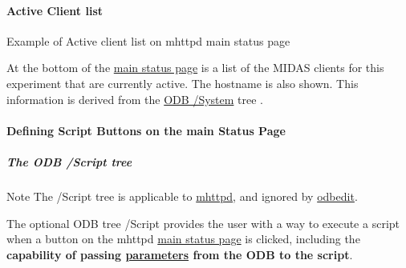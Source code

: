 \par


\par


\label{RC_mhttpd_status_page_features_idx_clients_active_mhttpd}
\hypertarget{RC_mhttpd_status_page_features_idx_clients_active_mhttpd}{}
 \hypertarget{RC_mhttpd_status_page_features_RC_mhttpd_status_clients}{}\paragraph{Active Client list}\label{RC_mhttpd_status_page_features_RC_mhttpd_status_clients}
\begin{center} Example of Active client list on mhttpd main status page \par
\par
\par
  \end{center}  \par


At the bottom of the \hyperlink{RC_mhttpd_Main_Status_page_RC_mhttpd_main_status}{main status page} is a list of the MIDAS clients for this experiment that are currently active. The hostname is also shown. This information is derived from the \hyperlink{RC_Run_States_and_Transitions_RC_odb_system_tree}{ODB /System} tree .

\par
\par


 \par
 \label{index_end}
\hypertarget{index_end}{}
 \paragraph{Defining Script Buttons on the main Status Page}\label{RC_mhttpd_defining_script_buttons}
\par




\label{RC_mhttpd_defining_script_buttons_idx_ODB_tree_Script}
\hypertarget{RC_mhttpd_defining_script_buttons_idx_ODB_tree_Script}{}
 \hypertarget{RC_mhttpd_defining_script_buttons_RC_odb_script_tree}{}\subparagraph{The ODB /Script tree}\label{RC_mhttpd_defining_script_buttons_RC_odb_script_tree}
\begin{DoxyNote}{Note}
The /Script tree is applicable to \hyperlink{RC_mhttpd}{mhttpd}, and ignored by \hyperlink{RC_odbedit}{odbedit}.
\end{DoxyNote}
The optional ODB tree /Script provides the user with a way to execute a script when a button on the mhttpd \hyperlink{RC_mhttpd_Main_Status_page_RC_mhttpd_main_status}{main status page} is clicked, including the {\bfseries capability of passing \hyperlink{structparameters}{parameters} from the ODB to the script}.

